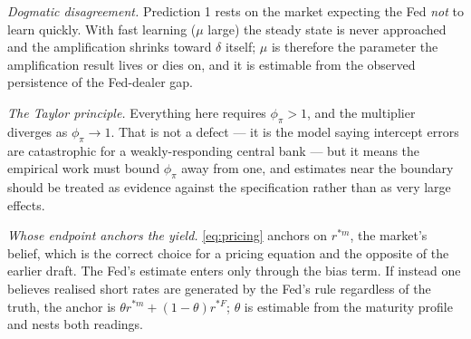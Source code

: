 \emph{Dogmatic disagreement.} Prediction 1 rests on the market expecting the Fed \emph{not} to
learn quickly. With fast learning ($\mu$ large) the steady state is never approached and the
amplification shrinks toward $\delta$ itself; $\mu$ is therefore the parameter the amplification
result lives or dies on, and it is estimable from the observed persistence of the Fed-dealer gap.

\emph{The Taylor principle.} Everything here requires $\phi_\pi>1$, and the multiplier diverges
as $\phi_\pi\to1$. That is not a defect --- it is the model saying intercept errors are
catastrophic for a weakly-responding central bank --- but it means the empirical work must
bound $\phi_\pi$ away from one, and estimates near the boundary should be treated as evidence
against the specification rather than as very large effects.

\emph{Whose endpoint anchors the yield.} \eqref{eq:pricing} anchors on $r^{*m}$, the market's
belief, which is the correct choice for a pricing equation and the opposite of the earlier draft.
The Fed's estimate enters only through the bias term. If instead one believes realised short
rates are generated by the Fed's rule regardless of the truth, the anchor is
$\theta r^{*m} + (1-\theta)r^{*F}$; $\theta$ is estimable from the maturity profile and nests
both readings.
